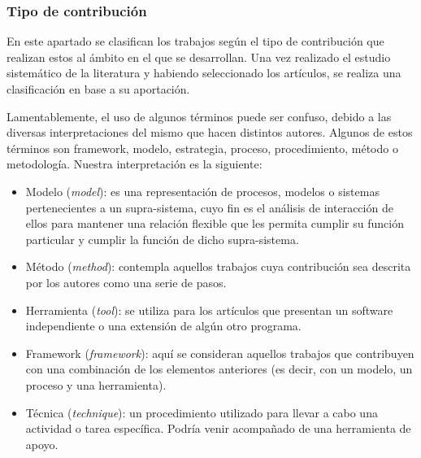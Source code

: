 \subsubsection*{Tipo de contribución}
En este apartado se clasifican los trabajos según el tipo de contribución que realizan estos al ámbito en el que se desarrollan. Una vez realizado el estudio sistemático de la literatura y habiendo seleccionado los artículos, se realiza una clasificación en base a su aportación.
 
Lamentablemente, el uso de algunos términos puede ser confuso, debido a las diversas interpretaciones del mismo que hacen distintos autores. Algunos de estos términos son framework, modelo, estrategia, proceso, procedimiento, método o metodología. Nuestra interpretación es la siguiente:
\begin{itemize}
\item Modelo (\emph{model}): es una representación de procesos, modelos o sistemas pertenecientes a un supra-sistema, cuyo fin es el análisis de interacción de ellos para mantener una relación flexible que les permita cumplir su función particular y cumplir la función de dicho supra-sistema.
\item Método (\emph{method}): contempla aquellos trabajos cuya contribución sea descrita por los autores como una serie de pasos.
\item Herramienta (\emph{tool}): se utiliza para los artículos que presentan un software independiente o una extensión de algún otro programa.
\item Framework (\emph{framework}): aquí se consideran aquellos trabajos que contribuyen con una combinación de los elementos anteriores (es decir, con un modelo, un proceso y una herramienta).
\item Técnica (\emph{technique}): un procedimiento utilizado para llevar a cabo una actividad o tarea específica. Podría venir acompañado de una herramienta de apoyo.
\end{itemize}

